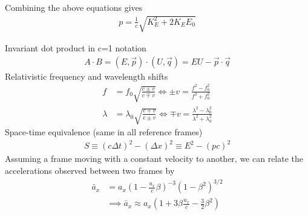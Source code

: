 \begin{multicols}{2}
Combining the above equations gives
\begin{align}
p=\frac{1}{c}\sqrt{K_E^2 + 2K_EE_0}
\end{align}

Invariant dot product in c=1 notation
\begin{align}
A \cdot B = (E, \vec{p}) \cdot (U, \vec{q}) = EU - \vec{p} \cdot \vec{q}
\end{align}
Relativistic frequency and wavelength shifts
\begin{align}
f &= f_0 \sqrt{\frac{c \pm v}{c \mp v}} 
\Longleftrightarrow \pm v=\frac{f^2-f_0^2}{f^2+f_0^2}  \\
\lambda &= \lambda_0 \sqrt{\frac{c \mp v}{c \pm v}} 
\Longleftrightarrow \mp v =\frac{\lambda^2-\lambda_0^2}{\lambda^2+\lambda_0^2}
\end{align}
Space-time equivalence (same in all reference frames)
\begin{align}
S \equiv (c \Delta t)^2 - (\Delta x)^2 \equiv E^2-(pc)^2
\end{align}
Assuming a frame moving with a constant velocity to another, we can relate the accelerations observed between two frames by
\begin{align}
	\bar{a}_x &= a_x\left(1-\frac{u_x }{c}\beta\right)^{-3}\left(1-\beta^2\right)^{3/2} \\
	&\implies \bar{a}_x \approx a_x \left(1+3\beta\frac{u_x}{c}-\frac{3}{2}\beta^2\right)
\end{align}

\end{multicols}
